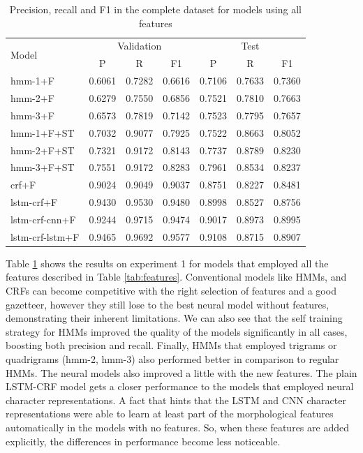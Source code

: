 \documentclass[sigconf]{acmart}
\begin{document}
\begin{table}[h]
  \small
  \begin{center}
    \begin{tabular}{ lllllll }
      \toprule
      \multirow{2}{*}{Model} & \multicolumn{3}{c}{Validation} & \multicolumn{3}{c}{Test} \\
                             & \multicolumn{1}{c}{P} & \multicolumn{1}{c}{R} & \multicolumn{1}{c}{F1}
                             & \multicolumn{1}{c}{P} & \multicolumn{1}{c}{R} & \multicolumn{1}{c}{F1} \\
      \midrule
      hmm-1+F	      & 0.6061 & 0.7282 & 0.6616 & 0.7106 & 0.7633 & 0.7360 \\
      hmm-2+F	      & 0.6279 & 0.7550 & 0.6856 & 0.7521 & 0.7810 & 0.7663 \\
      hmm-3+F	      & 0.6573 & 0.7819 & 0.7142 & 0.7523 & 0.7795 & 0.7657 \\
      hmm-1+F+ST      & 0.7032 & 0.9077 & 0.7925 & 0.7522 & 0.8663 & 0.8052 \\
      hmm-2+F+ST      & 0.7321 & 0.9172 & 0.8143 & 0.7737 & 0.8789 & 0.8230 \\
      hmm-3+F+ST      & 0.7551 & 0.9172 & 0.8283 & 0.7961 & 0.8534 & 0.8237 \\
      crf+F	      & 0.9024 & 0.9049 & 0.9037 & 0.8751 & 0.8227 & 0.8481 \\
      lstm-crf+F      & 0.9430 & 0.9530 & 0.9480 & 0.8998 & 0.8527 & 0.8756 \\
      lstm-crf-cnn+F  & 0.9244 & 0.9715 & 0.9474 & 0.9017 & 0.8973 & 0.8995 \\
      lstm-crf-lstm+F & 0.9465 & 0.9692 & 0.9577 & 0.9108 & 0.8715 & 0.8907 \\
      \bottomrule
    \end{tabular}
  \end{center}
  \caption{Precision, recall and F1 in the complete dataset for models using all features}
  \label{tab:experiment1f}
\end{table}

Table \ref{tab:experiment1f} shows the results on experiment 1 for models
that employed all the features described in Table \ref{tab:features}.
Conventional models like HMMs, and CRFs can become competitive with
the right selection of features and a good gazetteer, however they still lose
to the best neural model without features, demonstrating their inherent limitations.
We can also see that the self training strategy for HMMs improved the quality of 
the models significantly in all cases, boosting both precision and recall. Finally,
HMMs that employed trigrams or quadrigrams (hmm-2, hmm-3) also performed better in
comparison to regular HMMs.
The neural models also improved a little with the new features. The plain LSTM-CRF
model gets a closer performance to the models that employed neural character 
representations. A fact that hints that the LSTM and CNN character representations 
were able to learn at least part of the morphological features automatically in the
models with no features. So, when these features are added explicitly, the differences 
in performance become less noticeable.
\end{document}
